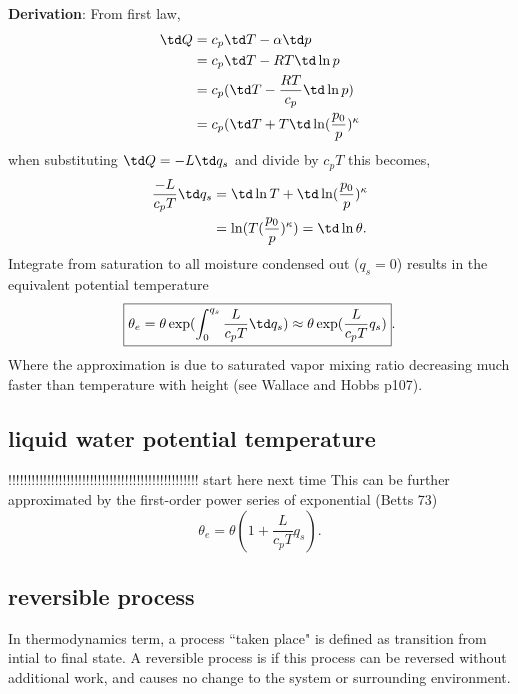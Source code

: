 {\bf{Derivation}}: From first law, 
\begin{equation}
\begin{aligned}
   \td Q & = c_p \td T - \alpha \td p \\ 
         & = c_p \td T - RT \td \ln p \\
         & = c_p( \td T - \frac{RT}{c_p} \td \ln p) \\
         & = c_p( \td T + T \td \ln(\frac{p_0}{p})^\kappa 
\end{aligned}
\end{equation}
when substituting $\td Q = -L\td q_{s}$ and divide by $c_p T$ this becomes, 
\begin{equation}
\begin{aligned}
   \frac{-L}{c_pT} \td q_{s} & = \td \ln T + \td \ln(\frac{p_0}{p})^\kappa \\
          & = \ln (T(\frac{p_0}{p})^\kappa) = \td \ln \theta.
\end{aligned}
\end{equation}
Integrate from saturation to all moisture condensed out ($q_{s}=0$) results in the equivalent potential
temperature
\begin{equation}
\begin{aligned}
   \boxed{\theta_e = \theta\exp(\int_0^{q_{s}} \frac{L}{c_pT} \td q_{s}) 
         \approx \theta\exp(\frac{L}{c_pT} q_{s})}.
\end{aligned}
\end{equation}
Where the approximation is due to saturated vapor mixing ratio decreasing much faster than
temperature with height (see Wallace and Hobbs p107). 


\subsection{liquid water potential temperature}
!!!!!!!!!!!!!!!!!!!!!!!!!!!!!!!!!!!!!!!!!!!!!!!!! start here next time
This can be further approximated by the first-order power series of exponential (Betts 73)
\begin{equation}
   \boxed{\theta_e = \theta(1 + \frac{L}{c_pT} q_{s})}.
\end{equation}

\subsection{reversible process}
In thermodynamics term, a process ``taken place" is defined as transition from intial to final
state. A reversible process is if this process can be reversed without additional work, and causes
no change to the system or surrounding environment. 

